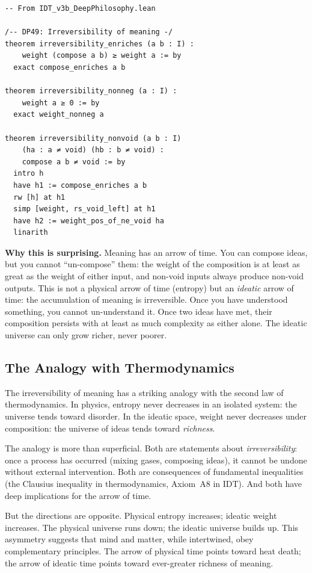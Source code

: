 \begin{lstlisting}
-- From IDT_v3b_DeepPhilosophy.lean

/-- DP49: Irreversibility of meaning -/
theorem irreversibility_enriches (a b : I) :
    weight (compose a b) ≥ weight a := by
  exact compose_enriches a b

theorem irreversibility_nonneg (a : I) :
    weight a ≥ 0 := by
  exact weight_nonneg a

theorem irreversibility_nonvoid (a b : I)
    (ha : a ≠ void) (hb : b ≠ void) :
    compose a b ≠ void := by
  intro h
  have h1 := compose_enriches a b
  rw [h] at h1
  simp [weight, rs_void_left] at h1
  have h2 := weight_pos_of_ne_void ha
  linarith
\end{lstlisting}

\begin{surprisebox}
\noindent\textbf{Why this is surprising.}
Meaning has an arrow of time.  You can compose ideas, but you cannot
``un-compose'' them: the weight of the composition is at least as great as
the weight of either input, and non-void inputs always produce non-void
outputs.  This is not a physical arrow of time (entropy) but an
\emph{ideatic} arrow of time: the accumulation of meaning is irreversible.
Once you have understood something, you cannot un-understand it.  Once two
ideas have met, their composition persists with at least as much complexity
as either alone.  The ideatic universe can only grow richer, never poorer.
\end{surprisebox}

\subsection{The Analogy with Thermodynamics}

The irreversibility of meaning has a striking analogy with the second law of
thermodynamics.  In physics, entropy never decreases in an isolated system: the
universe tends toward disorder.  In the ideatic space, weight never decreases
under composition: the universe of ideas tends toward \emph{richness}.

The analogy is more than superficial.  Both are statements about
\emph{irreversibility}: once a process has occurred (mixing gases, composing
ideas), it cannot be undone without external intervention.  Both are
consequences of fundamental inequalities (the Clausius inequality in
thermodynamics, Axiom~A8 in IDT).  And both have deep implications for the
arrow of time.

But the directions are opposite.  Physical entropy increases; ideatic weight
increases.  The physical universe runs down; the ideatic universe builds up.
This asymmetry suggests that mind and matter, while intertwined, obey
complementary principles.  The arrow of physical time points toward heat death;
the arrow of ideatic time points toward ever-greater richness of meaning.

